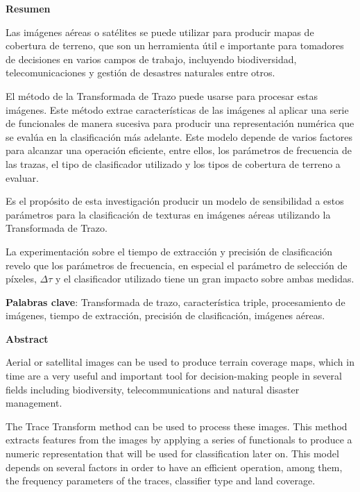 \doublespacing

\vspace*{\fill}
\begin{center} 
    \textbf{Resumen}
\end{center}

Las imágenes aéreas o satélites se puede utilizar para producir mapas de cobertura de terreno, que son un herramienta útil e importante para tomadores de decisiones en varios campos de trabajo, incluyendo biodiversidad, telecomunicaciones y gestión de desastres naturales entre otros.

El método de la Transformada de Trazo puede usarse para procesar estas imágenes. Este método extrae características de las imágenes al aplicar una serie de funcionales de manera sucesiva para producir una representación numérica que se evalúa en la clasificación más adelante. Este modelo depende de varios factores para alcanzar una operación eficiente, entre ellos, los parámetros de frecuencia de las trazas, el tipo de clasificador utilizado y los tipos de cobertura de terreno a evaluar.

Es el propósito de esta investigación producir un modelo de sensibilidad a estos parámetros para la clasificación de texturas en imágenes aéreas utilizando la Transformada de Trazo.

La experimentación sobre el tiempo de extracción y precisión de clasificación revelo que los parámetros de frecuencia, en especial el parámetro de selección de píxeles, $\Delta \tau$ y el clasificador utilizado tiene un gran impacto sobre ambas medidas.

\textbf{Palabras clave}: Transformada de trazo, característica triple, procesamiento de imágenes, tiempo de extracción, precisión de clasificación, imágenes aéreas.
\vspace*{\fill}


\newpage


\vspace*{\fill}

\begin{center}
    \textbf{Abstract}
\end{center}


Aerial or satellital images can be used to produce terrain coverage maps, which in time are a very useful and important tool for decision-making people in several fields including biodiversity, telecommunications and natural disaster management.

The Trace Transform method can be used to process these images. This method extracts features from the images by applying a series of functionals to produce a numeric representation that will be used for classification later on. This model depends on several factors in order to have an efficient operation, among them, the frequency parameters of the traces, classifier type and land coverage.

